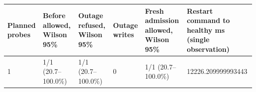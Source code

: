 \begin{tabular}{llllll}
\hline
Planned probes & Before allowed, Wilson 95\% & Outage refused, Wilson 95\% & Outage writes & Fresh admission allowed, Wilson 95\% & Restart command to healthy ms (single observation) \\
\hline
1 & 1/1 (20.7--100.0\%) & 1/1 (20.7--100.0\%) & 0 & 1/1 (20.7--100.0\%) & 12226.209999993443 \\
\hline
\end{tabular}
